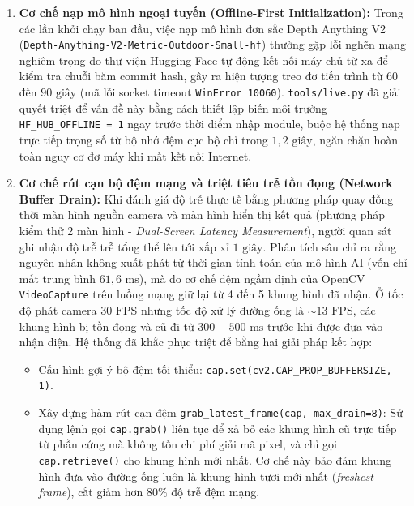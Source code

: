 \begin{enumerate}
    \item \textbf{Cơ chế nạp mô hình ngoại tuyến (Offline-First Initialization):} Trong các lần khởi chạy ban đầu, việc nạp mô hình đơn sắc Depth Anything V2 (\texttt{Depth-Anything-V2-Metric-Outdoor-Small-hf}) thường gặp lỗi nghẽn mạng nghiêm trọng do thư viện Hugging Face tự động kết nối máy chủ từ xa để kiểm tra chuỗi băm commit hash, gây ra hiện tượng treo đơ tiến trình từ $60$ đến $90\text{ giây}$ (mã lỗi socket timeout \texttt{WinError 10060}). \texttt{tools/live.py} đã giải quyết triệt để vấn đề này bằng cách thiết lập biến môi trường \texttt{HF\_HUB\_OFFLINE = 1} ngay trước thời điểm nhập module, buộc hệ thống nạp trực tiếp trọng số từ bộ nhớ đệm cục bộ chỉ trong $1,2\text{ giây}$, ngăn chặn hoàn toàn nguy cơ đơ máy khi mất kết nối Internet.
    
    \item \textbf{Cơ chế rút cạn bộ đệm mạng và triệt tiêu trễ tồn đọng (Network Buffer Drain):} Khi đánh giá độ trễ thực tế bằng phương pháp quay đồng thời màn hình nguồn camera và màn hình hiển thị kết quả (phương pháp kiểm thử 2 màn hình - \textit{Dual-Screen Latency Measurement}), người quan sát ghi nhận độ trễ trễ tổng thể lên tới xấp xỉ $1\text{ giây}$. Phân tích sâu chỉ ra rằng nguyên nhân không xuất phát từ thời gian tính toán của mô hình AI (vốn chỉ mất trung bình $61,6\text{ ms}$), mà do cơ chế đệm ngầm định của OpenCV \texttt{VideoCapture} trên luồng mạng giữ lại từ 4 đến 5 khung hình đã nhận. Ở tốc độ phát camera $30\text{ FPS}$ nhưng tốc độ xử lý đường ống là $\sim 13\text{ FPS}$, các khung hình bị tồn đọng và cũ đi từ $300 - 500\text{ ms}$ trước khi được đưa vào nhận diện. Hệ thống đã khắc phục triệt để bằng hai giải pháp kết hợp:
    \begin{itemize}
        \item Cấu hình gợi ý bộ đệm tối thiểu: \texttt{cap.set(cv2.CAP\_PROP\_BUFFERSIZE, 1)}.
        \item Xây dựng hàm rút cạn đệm \texttt{grab\_latest\_frame(cap, max\_drain=8)}: Sử dụng lệnh gọi \texttt{cap.grab()} liên tục để xả bỏ các khung hình cũ trực tiếp từ phần cứng mà không tốn chi phí giải mã pixel, và chỉ gọi \texttt{cap.retrieve()} cho khung hình mới nhất. Cơ chế này bảo đảm khung hình đưa vào đường ống luôn là khung hình tươi mới nhất (\textit{freshest frame}), cắt giảm hơn $80\%$ độ trễ đệm mạng.
    \end{itemize}


\end{enumerate}
